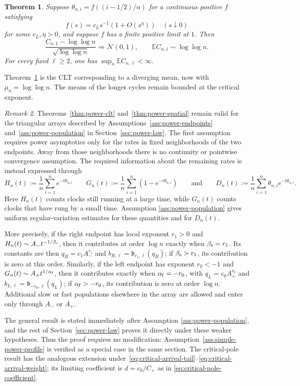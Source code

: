 \documentclass[11pt]{article}
\newtheorem{theorem}{Theorem}[section]
\theoremstyle{remark}
\newtheorem{remark}[theorem]{Remark}
\theoremstyle{plain}
\newcommand{\E}{\mathbb E}
\begin{document}
\begin{theorem}
\label{thm:critical-pole}
Suppose $\theta_{n,i}=f((i-1/2)/n)$ for a continuous positive $f$ satisfying
\[
 f(s)=c_Ls^{-1}(1+O(s^\eta))
 \quad(s\downarrow0)
\]
for some $c_L,\eta>0$, and suppose $f$ has a finite positive limit at $1$.
Then
\begin{equation}\label{eq:critical-fixed-clt}
 \frac{C_{n,1}-\log\log n}{\sqrt{\log\log n}}
 \Longrightarrow\mathcal N(0,1),
 \qquad
 \E C_{n,1}\sim\log\log n.
\end{equation}
For every fixed $\ell\ge2$, one has $\sup_n\E C_{n,\ell}<\infty$.
\end{theorem}

Theorem~\ref{thm:critical-pole} is the CLT corresponding to a diverging mean,
now with $\mu_n=\log\log n$.  The means of the longer cycles remain bounded
at the critical exponent.

\begin{remark}\label{rmk:power-population}
Theorems~\ref{thm:power-clt} and~\ref{thm:power-spatial} remain valid for the
triangular arrays described by Assumptions~\ref{ass:power-endpoints}
and~\ref{ass:power-population} in Section~\ref{sec:power-law}.  The first
assumption requires power asymptotics only for the rates in fixed
neighborhoods of the two endpoints.  Away from those neighborhoods there is
no continuity or pointwise convergence assumption.  The required information
about the remaining rates is instead expressed through
\[
 H_n(t):=\frac1n\sum_{i=1}^ne^{-t\theta_{n,i}}
 \qquad
 G_n(t):=\frac1n\sum_{i=1}^n(1-e^{-t\theta_{n,i}})
 \qquad\text{and}\qquad
 D_n(t):=\frac1n\sum_{i=1}^n\theta_{n,i}e^{-t\theta_{n,i}}.
\]
Here $H_n(t)$ counts clocks still running at a large time, while $G_n(t)$
counts clocks that have rung by a small time.  Assumption
\ref{ass:power-population} gives uniform regular-variation estimates for
these quantities and for $D_n(t)$.

More precisely, if the right endpoint has local exponent $r_1>0$ and
$H_n(t)\sim A_-t^{-1/\beta_{\rm s}}$, then it contributes at order $\log n$
exactly when $\beta_{\rm s}=r_1$.  Its constants are then
$q_R=c_1A_-^{r_1}$ and
$b_{R,\ell}=\mathfrak b_{r_1,\ell}(q_R)$; if
$\beta_{\rm s}>r_1$, its contribution is zero at this order.  Similarly, if
the left endpoint has exponent $r_0<-1$ and
$G_n(t)\sim A_+t^{1/\alpha_{\rm f}}$, then it contributes exactly when
$\alpha_{\rm f}=-r_0$, with
$q_L=c_0A_+^{r_0}$ and
$b_{L,\ell}=\mathfrak b_{-r_0,\ell}(q_L)$; if
$\alpha_{\rm f}>-r_0$, its contribution is zero at order $\log n$.
Additional slow or fast populations elsewhere in the array are allowed and
enter only through $A_-$ or $A_+$.

The general result is stated immediately after Assumption
\ref{ass:power-population}, and the rest of Section~\ref{sec:power-law}
proves it directly under these weaker hypotheses.  Thus the proof requires
no modification: Assumption~\ref{ass:simple-power-profile} is verified as a
special case in the same section.  The critical-pole result has the analogous
extension under~\eqref{eq:critical-arrival-tail}--\eqref{eq:critical-arrival-weight};
its limiting coefficient is $d=c_0/C_+$ as in
\eqref{eq:critical-pole-coefficient}.
\end{remark}
\end{document}
